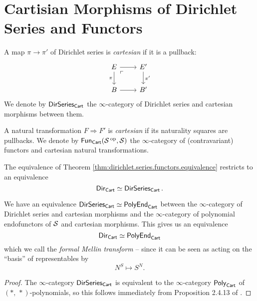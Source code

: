\section{Cartisian Morphisms of Dirichlet Series and Functors}

\begin{defn}
A map $\pi \to \pi'$ of Dirichlet series is \emph{cartesian} if it
is a pullback:
\[
  \begin{tikzcd}
    E \arrow[d, "\pi"'] \arrow[r] \arrow[dr, phantom, "\ulcorner" very near
    start] & E' \arrow[d, "\pi'"] \\
    B \arrow[r] & B'
  \end{tikzcd}
\]
We denote by $\operatorname{\mathsf{{DirSeries}}}_{\mathsf{{Cart}}}$ the $\infty$-category of Dirichlet
series and cartesian morphisms between them.

A natural transformation $F \Rightarrow F'$ is \emph{cartesian} if its
naturality squares are pullbacks. We denote by $\operatorname{\mathsf{{Fun}}}_{\mathsf{{Cart}}}(\operatorname{\mathcal{S}}\operatorname{^\text{op}}, \operatorname{\mathcal{S}})$
the $\infty$-category of (contravariant) functors and cartesian natural transformations.
\end{defn}

\begin{prop}
The equivalence of Theorem \ref{thm:dirichlet.series.functors.equivalence}
restricts to an equivalence
$$\operatorname{\mathsf{{Dir}}}_{\mathsf{{Cart}}} \simeq \operatorname{\mathsf{{DirSeries}}}_{\mathsf{{Cart}}}.$$
\end{prop}

\begin{thm}\label{thm:formal.mellin.transform}
We have an equivalence $\operatorname{\mathsf{{DirSeries}}}_{\mathsf{{Cart}}} \simeq
\mathsf{{PolyEnd}}_{\mathsf{{Cart}}}$ between the $\infty$-category of Dirichlet series
and cartesian morphisms and the $\infty$-category of polynomial endofunctors of
$\operatorname{\mathcal{S}}$ and cartesian morphisms. This gives us an equivalence
$$\operatorname{\mathsf{{Dir}}}_{\mathsf{{Cart}}} \simeq \mathsf{{PolyEnd}}_{\mathsf{{Cart}}}$$
which we call the \emph{formal Mellin transform} -- since it can be seen as
acting on the ``basis'' of representables by
$$N^S \mapsto S^N.$$
\end{thm}
\begin{proof}
The $\infty$-category $\operatorname{\mathsf{{DirSeries}}}_{\mathsf{{Cart}}}$ is equivalent to the $\infty$-category
$\mathsf{{Poly}}_{\mathsf{{Cart}}}$ of $(\ast,\, \ast)$-polynomials, so this follows immediately from Proposition 2.4.13 of \cite{GHK:Analytic.Monads}.
\end{proof}

